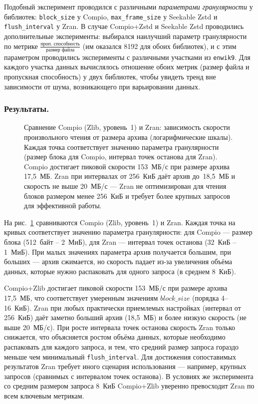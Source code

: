Подобный эксперимент проводился с различными \textit{параметрами гранулярности} у библиотек: \texttt{block\_size} у Compio, \texttt{max\_frame\_size} у Seekable Zstd и \texttt{flush\_interval} у Zran. В случае Compio+Zstd и Seekable Zstd проводились дополнительные эксперименты: выбирался наилучший параметр гранулярности по метрике $\frac{\text{проп. способность}}{\text{размер файла}}$ (им оказался 8192 для обоих библиотек), и с этим параметром проводились эксперименты с различными участками из \texttt{enwik9}. Для каждого участка данных вычислялось отношение обоих метрик (размер файла и пропускная способность) у двух библиотек, чтобы увидеть тренд вне зависимости от шума, возникающего при варьировании данных.

\subsubsection{Результаты.}

\begin{figure}[h]
    \centering
    
    \caption{Сравнение Compio (Zlib, уровень~1) и Zran: зависимость скорости произвольного чтения от размера архива (логарифмические шкалы). Каждая точка соответствует значению параметра гранулярности (размер блока для Compio, интервал точек останова для Zran). Compio достигает пиковой скорости 153~МБ/с при размере архива 17,5~МБ. Zran при интервалах от 256~КиБ даёт архив до~18,5~МБ и скорость не выше 20~МБ/с --- Zran не оптимизирован для чтения блоков размером менее 256~КиБ и требует более крупных запросов для эффективной работы.}
    \label{fig:alternatives-1}
\end{figure}

На рис.~\ref{fig:alternatives-1} сравниваются Compio (Zlib, уровень~1) и Zran. Каждая точка на кривых соответствует значению параметра гранулярности: для Compio --- размер блока (512~байт -- 2~МиБ), для Zran --- интервал точек останова (32~КиБ -- 1~МиБ). При малых значениях параметра архив получается большим, при больших --- архив сжимается, но скорость падает из-за увеличения объёма данных, которые нужно распаковать для одного запроса (в среднем 8~КиБ).

Compio+Zlib достигает пиковой скорости 153~МБ/с при размере архива 17,5~МБ, что соответствует умеренным значениям \(block\_size\) (порядка 4--16~КиБ). Zran при любых практически приемлемых настройках (интервал от 256~КиБ) даёт заметно больший архив (18,5~МБ) и более низкую скорость (не выше 20~МБ/с). При росте интервала точек останова скорость Zran только снижается, что объясняется ростом объёма данных, которые необходимо распаковать для каждого запроса, и тем, что средний размер запроса гораздо меньше чем минимальный \texttt{flush\_interval}. Для достижения сопоставимых результатов Zran требует иного сценария использования --- например, крупных запросов (сравнимых с интервалом точек останова). В условиях же эксперимента со средним размером запроса 8~КиБ Compio+Zlib уверенно превосходит Zran по всем ключевым метрикам.

